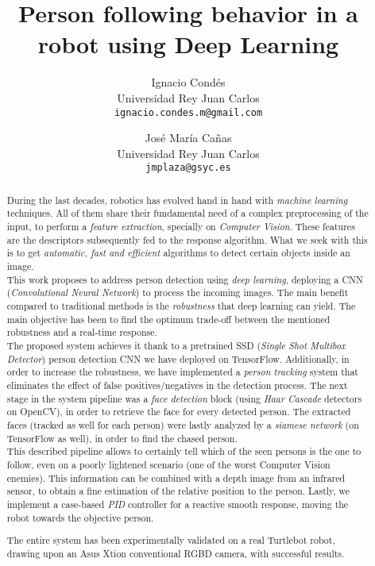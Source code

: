 \documentclass[11pt, a4paper]{article}
\title{Person following behavior in a robot using Deep Learning}
\author{Ignacio Condés \\
		Universidad Rey Juan Carlos \\
		\texttt{ignacio.condes.m@gmail.com} \and José María Cañas \\
		Universidad Rey Juan Carlos\\
		\texttt{jmplaza@gsyc.es}}
\begin{document}
	\maketitle
	
	\begin{abstract}
		During the last decades, robotics has evolved hand in hand with \emph{machine learning} techniques. All of them share their fundamental need of a complex preprocessing of the input, to perform a \emph{feature extraction}, specially on \emph{Computer Vision}. These features are the descriptors subsequently fed to the response algorithm. What we seek with this is to get \emph{automatic, fast and efficient} algorithms to detect certain objects inside an image.\\
		
		This work proposes to address person detection using \emph{deep learning}, deploying a CNN (\emph{Convolutional Neural Network}) to process the incoming images. The main benefit compared to traditional methods is the \emph{robustness} that deep learning can yield. The main objective has been to find the optimum trade-off between the mentioned robustness and a real-time response.\\
		
		The proposed system achieves it thank to a pretrained SSD (\emph{Single Shot Multibox Detector}) person detection CNN we have deployed on TensorFlow. Additionally, in order to increase the robustness, we have implemented a \emph{person tracking} system that eliminates the effect of false positives/negatives in the detection process. The next stage in the system pipeline was a \emph{face detection} block (using \emph{Haar Cascade} detectors on OpenCV), in order to retrieve the face for every detected person. The extracted faces (tracked as well for each person) were lastly analyzed by a \emph{siamese network} (on TensorFlow as well), in order to find the chased person.\\
		
		This described pipeline allows to certainly tell which of the seen persons is the one to follow, even on a poorly lightened scenario (one of the worst Computer Vision enemies). This information can be combined with a depth image from an infrared sensor, to obtain a fine estimation of the relative position to the person. Lastly, we implement a case-based \emph{PID} controller for a reactive smooth response, moving the robot towards the objective person.
		
		
		
		The entire system has been experimentally validated on a real Turtlebot robot, drawing upon an Asus Xtion conventional RGBD camera, with successful results.
	\end{abstract}

	
	
\end{document}
